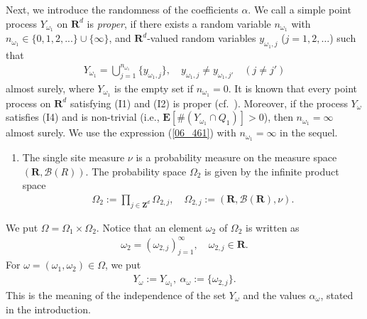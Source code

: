 \documentclass[12pt,a4paper]{article}
\begin{document}
Next, we introduce the randomness of the coefficients 
$\alpha$.
We call a simple point process $Y_{\omega_1}$ on $\mathbf{R}^d$ is \textit{proper},
if there exists a random variable $n_{\omega_1}$ 
with $n_{\omega_1}\in \{0,1,2,...\}\cup\{\infty\}$,
and $\mathbf{R}^d$-valued random variables
$y_{\omega_1,j}$ ($j=1,2,\ldots$) such that
\begin{align}
\label{06_461}
Y_{\omega_1}=\bigcup_{j=1}^{n_{\omega_1}}\{y_{\omega_1,j}\},
\quad
y_{\omega_1,j}\not=y_{\omega_1,j'} \quad (j\not=j')
\end{align}
almost surely,
where $Y_{\omega_1}$ is the empty set if $n_{\omega_1}=0$.
It is known that every point process on $\mathbf{R}^d$ satisfying (I1) and (I2) is
proper (cf.\ \cite[Proposition 6.3]{La-Pe}).
Moreover, if the process 
$Y_{\omega}$ 
satisfies (I4) and is non-trivial 
(i.e., $\mathbf{E}[\#(Y_{\omega_1}\cap Q_1)]>0$),
then $n_{\omega_1}=\infty$ almost surely.
We use the expression (\ref{06_461}) 
with $n_{\omega_1}=\infty$ in the sequel.




\begin{enumerate}
 \item[(I7)] The single site measure $\nu$ 
is a probability measure on the measure space $(\mathbf{R},\mathcal{B}(R))$.
The probability space $\Omega_2$ is given by the infinite product space
\begin{align*}
 \Omega_2:=\prod_{j\in \mathbf{Z}^d} \Omega_{2,j},\quad
\Omega_{2,j}:=(\mathbf{R},\mathcal{B}(\mathbf{R}),\nu).
\end{align*}
\end{enumerate}


We put $\Omega=\Omega_1\times \Omega_2$.
Notice that an element $\omega_2$ of $\Omega_2$ 
is written as
\begin{align*}
 \omega_2=(\omega_{2,j})_{j=1}^\infty,\quad \omega_{2,j}\in \mathbf{R}.
\end{align*}
For $\omega=(\omega_1,\omega_2)\in \Omega$,
we put 
\begin{align*}
Y_\omega:=Y_{\omega_1},\ 
\alpha_\omega:=\{\omega_{2,j}\}.
\end{align*}
This is the meaning of the independence of 
the set $Y_{\omega}$ and the values $\alpha_{\omega}$,
stated in the introduction.
\end{document}
